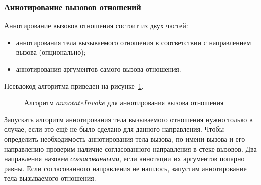 
\subsubsection{Аннотирование вызовов отношений}

Аннотирование вызовов отношения состоит из двух частей:
\begin{itemize}
    \item аннотирования тела вызываемого отношения в соответствии с направлением вызова (опционально);
    \item аннотирования аргументов самого вызова отношения.
\end{itemize}
Псевдокод алгоритма приведен на рисунке~\ref{alg:annotateInvoke}.

\begin{figure}[h!]
  \begin{center}
  \begin{minipage}{1\textwidth}
\begin{algorithm}[H]
\end{algorithm}
  \end{minipage}
  \end{center}
  \caption{Алгоритм $annotateInvoke$ для аннотирования вызова отношения}
  \label{alg:annotateInvoke}
\end{figure}

Запускать алгоритм аннотирования тела вызываемого отношения нужно только в случае, если это ещё не было сделано для данного направления.
Чтобы определить необходимость аннотирования тела вызова, по имени вызова и его направлению проверим наличие согласованного направления в стеке вызовов.
Два направления назовем \emph{согласованными}, если аннотации их аргументов попарно равны.
Если согласованного направления не нашлось, запустим аннотирование тела вызываемого отношения.


